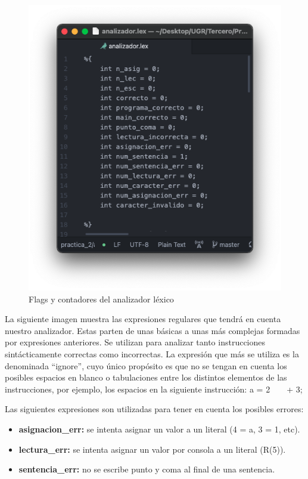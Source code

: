 \begin{figure}[H] 
	\centering
	\includegraphics[scale=0.5]{../practica_2/images/variables.png} 
	\caption{Flags y contadores del analizador léxico} 
    \label{fig:variables}
\end{figure}

La siguiente imagen muestra las expresiones regulares que tendrá en cuenta nuestro analizador. Estas parten de unas básicas a unas más complejas formadas por expresiones anteriores. Se utilizan
para analizar tanto instrucciones sintácticamente correctas como incorrectas. La expresión que más se utiliza es la denominada ``ignore'', cuyo único propósito es que no se tengan en cuenta
los posibles espacios en blanco o tabulaciones entre los distintos elementos de las instrucciones, por ejemplo, los espacios en la siguiente instrucción: a = 2\ \ \ \ + 3;

Las siguientes expresiones son utilizadas para tener en cuenta los posibles errores:
\begin{itemize}
	\item \textbf{asignacion\_err:} se intenta asignar un valor a un literal (4 = a, 3 = 1, etc).
	\item \textbf{lectura\_err:} se intenta asignar un valor por consola a un literal (R(5)).
	\item \textbf{sentencia\_err:} no se escribe punto y coma al final de una sentencia.
\end{itemize}

